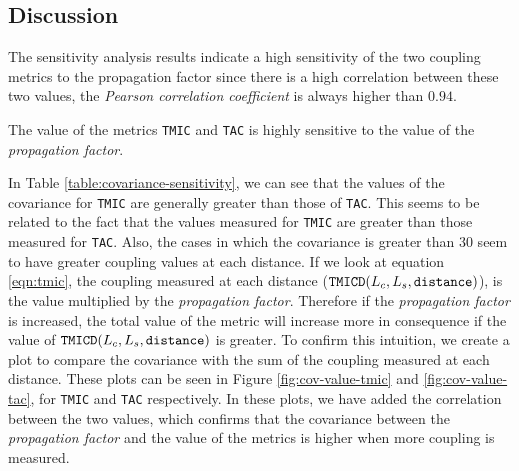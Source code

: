 \subsection{Discussion}
The sensitivity analysis results indicate a high sensitivity of the two coupling metrics to the propagation factor since there is a high correlation between these two values, the \textit{Pearson correlation coefficient} is always higher than $0.94$.

\begin{finding}
	The value of the metrics \texttt{TMIC} and \texttt{TAC} is highly sensitive to the value of the \textit{propagation factor}.
	\label{find:high-sensitivity}
\end{finding}

In Table \ref{table:covariance-sensitivity}, we can see that the values of the covariance for \texttt{TMIC} are generally greater than those of \texttt{TAC}. This seems to be related to the fact that the values measured for \texttt{TMIC} are greater than those measured for \texttt{TAC}. Also, the cases in which the covariance is greater than $30$ seem to have greater coupling values at each distance. If we look at equation \ref{eqn:tmic}, the coupling measured at each distance ($\verb|TMICD|(L_c,L_s, \verb|distance|)$), is the value multiplied by the \textit{propagation factor}. Therefore if the \textit{propagation factor} is increased, the total value of the metric will increase more in consequence if the value of $\verb|TMICD|(L_c,L_s, \verb|distance|)$ is greater. To confirm this intuition, we create a plot to compare the covariance with the sum of the coupling measured at each distance. These plots can be seen in Figure \ref{fig:cov-value-tmic} and \ref{fig:cov-value-tac}, for \texttt{TMIC} and \texttt{TAC} respectively. In these plots, we have added the correlation between the two values, which confirms that the covariance between the \textit{propagation factor} and the value of the metrics is higher when more coupling is measured.

